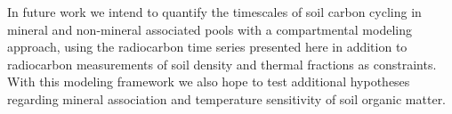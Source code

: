 \documentclass[english,man,floatsintext]{apa6}
\begin{document}
In future work we intend to quantify the timescales of soil carbon cycling in mineral and non-mineral associated pools with a compartmental modeling approach, using the radiocarbon time series presented here in addition to radiocarbon measurements of soil density and thermal fractions as constraints. With this modeling framework we also hope to test additional hypotheses regarding mineral association and temperature sensitivity of soil organic matter.


\clearpage
\renewcommand{\listfigurename}{Figure captions}
\end{document}
